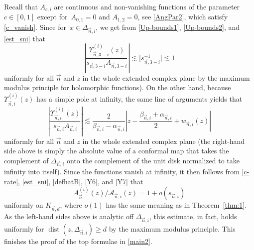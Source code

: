 \documentclass[10pt,a4paper]{amsart}
\numberwithin{equation}{section}
\newcommand{\dist}{\operatorname{dist}}
\newcommand{\n}{{\vec n}}
\begin{document}
Recall that $ A_{c,i} $ are continuous and non-vanishing functions of the parameter $ c\in[0,1] $ except for~$ {A_{0,1}=0 }$ and $ A_{1,2} =0 $, see \eqref{AngPar2}, which satisfy \eqref{c_vanish}. Since \smash{$ \Upsilon_{\n,j\pm}^{(0)}(x) = \Upsilon_{\n,j\mp}^{(i)}(x) $} for~${ x\in\Delta_{\n,i} }$, we get from \eqref{Up-bounds1}, \eqref{Up-bounds2}, and \eqref{est_sni} that
\begin{equation}
\label{Y6}
\left| \frac{\Upsilon_{\n,3-i}^{(i)}(z)}{s_{\n,3-i}A_{\n,3-i}} \right| \lesssim \big| s_{\n,3-i}^{-1} \big| \lesssim 1
\end{equation}
uniformly for all $ \n $ and $ z $ in the whole extended complex plane by the maximum modulus principle for holomorphic functions). On the other hand, because $ \Upsilon_{\n,i}^{(i)}(z) $ has a simple pole at infinity, the same line of arguments yields that
\begin{equation}
\label{Y7}
\left| \frac{\Upsilon_{\n,i}^{(i)}(z)}{s_{\n,i}A_{\n,i}} \right| \lesssim \frac2{\beta_{\n,i}-\alpha_{\n,i}} \left| z - \frac{\beta_{\n,i}+\alpha_{\n,i}}2 + w_{\n,i}(z) \right|
\end{equation}
uniformly for all $ \n $ and $ z $ in the whole extended complex plane (the right-hand side above is simply the absolute value of a conformal map that takes the complement of $ \Delta_{\n,i} $ onto the complement of the unit disk normalized to take infinity into itself). Since the functions  vanish at infinity, it then follows from \eqref{c-rate}, \eqref{est_sni}, \eqref{defhatB}, \eqref{Y6}, and \eqref{Y7} that
\[
A_\n^{(i)}(z) / \mathcal A_{\n,i}(z) = 1 + o(s_{\n,i})
\]
uniformly on $ K_{\n,d} $, where $ o(1) $ has the same meaning as in Theorem~\ref{thm:1}. As the left-hand sides above is analytic off $ \Delta_{\n,i} $, this estimate, in fact, holds uniformly for $ \dist(z,\Delta_{\n,i})\geq d $ by the maximum modulus principle. This finishes the proof of the top formulae in \eqref{main2}.
\end{document}
